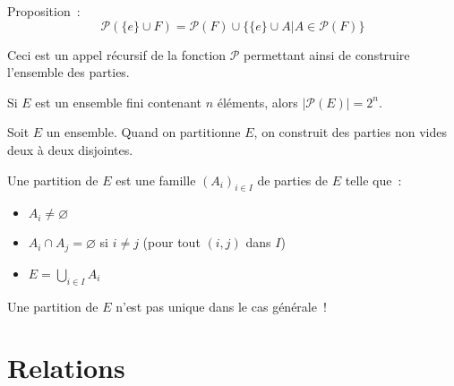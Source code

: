 \documentclass[a4paper, titlepage]{article}
\begin{document}
    Proposition~: $$ \mathcal{P}(\{e\}\cup F) = \mathcal{P}(F)\cup\{\{e\}\cup A|A\in\mathcal{P}(F)\} $$

    Ceci est un appel récursif de la fonction $\mathcal{P}$ permettant ainsi de construire l'ensemble des parties.
    \begin{corol}
        Si $E$ est un ensemble fini contenant $n$ éléments, alors $|\mathcal{P}(E)|=2^n$.
    \end{corol}
    \begin{defn}
        Soit $E$ un ensemble.
        Quand on partitionne $E$, on construit des parties non vides deux à deux disjointes.

        Une partition de $E$ est une famille $(A_i)_{i\in I}$ de parties de $E$ telle que~:
        \begin{itemize}
            \item $A_i\neq\varnothing$
            \item $A_i\cap A_j = \varnothing$ si $i\neq j$ (pour tout $(i,j)$ dans $I$)
            \item $E=\bigcup_{i\in I} A_i$
        \end{itemize}
    \end{defn}
    \begin{warn}
        Une partition de $E$ n'est pas unique dans le cas générale~!
    \end{warn}
    \section{Relations}
\end{document}

